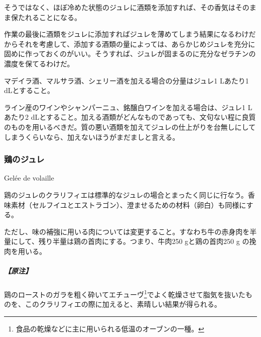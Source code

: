 \begin{recette}
そうではなく、ほぼ冷めた状態のジュレに酒類を添加すれば、その香気はそのまま保たれることになる。

作業の最後に酒類をジュレに添加すればジュレを薄めてしまう結果になるわけだからそれを考慮して、添加する酒類の量によっては、あらかじめジュレを充分に固めに作っておくのがいい。そうすれば、ジュレが固まるのに充分なゼラチンの濃度を保てるわけだ。

マデイラ酒、マルサラ酒、シェリー酒を加える場合の分量はジュレ1 Lあたり1
dLとすること。

ライン産のワインやシャンパーニュ、銘醸白ワインを加える場合は、ジュレ1
Lあたり2
dLとすること。加える酒類がどんなものであっても、文句ない程に良質のものを用いるべきだ。質の悪い酒類を加えてジュレの仕上がりを台無しにしてしまうくらいなら、加えないほうがまだましと言える。

\atoaki{}

\hypertarget{gelee-de-volaille}{%
\subsubsection{鶏のジュレ}\label{gelee-de-volaille}}

\begin{frsubenv}

Gelée de volaille

\end{frsubenv}


鶏のジュレのクラリフィエは標準的なジュレの場合とまったく同じに行なう。香味素材（セルフイユとエストラゴン）、澄ませるための材料（卵白）も同様にする。

ただし、味の補強に用いる肉については変更すること。すなわち牛の赤身肉を半量にして、残り半量は鶏の首肉にする。つまり、牛肉250
gと鶏の首肉250 g の挽肉を用いる。

\hypertarget{nota-gelee-de-volaile}{%
\subparagraph{【原注】}\label{nota-gelee-de-volaile}}

鶏のローストのガラを粗く砕いてエチューヴ\footnote{食品の乾燥などに主に用いられる低温のオーブンの一種。}でよく乾燥させて脂気を抜いたものを、このクラリフィエの際に加えると、素晴しい結果が得られる。

\atoaki{}


\end{recette}
